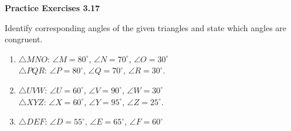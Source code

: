 \vspace{0.3ex}
\noindent\textbf{Practice Exercises 3.17}

\vspace{0.2ex}

Identify corresponding angles of the given triangles and state which angles are congruent.

\begin{enumerate}[label=\color{blue}\arabic*.]
    \item \(\triangle MNO\): \(\angle M = 80^\circ\), \(\angle N = 70^\circ\), \(\angle O = 30^\circ\) \\
    \(\triangle PQR\): \(\angle P = 80^\circ\), \(\angle Q = 70^\circ\), \(\angle R = 30^\circ\).
    \item \(\triangle UVW\): \(\angle U = 60^\circ\), \(\angle V = 90^\circ\), \(\angle W = 30^\circ\) \\
    \(\triangle XYZ\): \(\angle X = 60^\circ\), \(\angle Y = 95^\circ\), \(\angle Z = 25^\circ\).
    \item \(\triangle DEF\): \(\angle D = 55^\circ\), \(\angle E = 65^\circ\), \(\angle F = 60^\circ\) \\

\end{enumerate}
